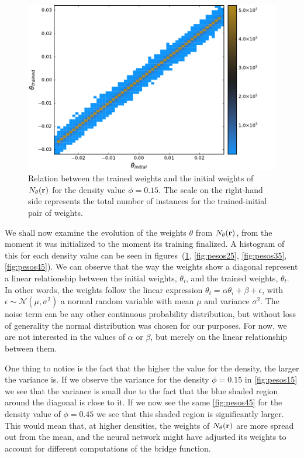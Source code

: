 \begin{figure}
    \includegraphics[width=\textwidth]{figuras/capitulo-3/weights_phi=0.15.pdf}
    \caption[Comparison between weights, $\phi=0.15$.]{Relation between the trained weights and the initial weights of $N_{\theta}(\mathbf{r})$ for the density value $\phi=0.15$. The scale on the right-hand side represents the total number of instances for the trained-initial pair of weights.} 
    \label{fig:pesos15}
\end{figure}

We shall now examine the evolution of the weights $\theta$ from
$N_{\theta}(\mathbf{r})$, from the moment it was initialized to the moment its training finalized.
A histogram of this for each density value can be seen in
figures~(\ref{fig:pesos15}, \ref{fig:pesos25}, \ref{fig:pesos35}, \ref{fig:pesos45}).
We can observe that the way the weights show a diagonal represent a linear relationship 
between the initial weights, $\theta_{i}$, and the trained weights, $\theta_{t}$. In other 
words, the weights follow the linear expression
$\theta_{t} = \alpha \theta_{i} + \beta + \epsilon$, with
$\epsilon \sim \mathcal{N}(\mu, \sigma^{2})$ a normal random variable with mean
$\mu$ and variance $\sigma^2$. The noise term can be any other continuous probability 
distribution, but without loss of generality the normal distribution was chosen for
our purposes. For now, we are not interested in the values of $\alpha$ or $\beta$,
but merely on the linear relationship between them.

One thing to notice is the fact that the higher the value for the density, the larger
the variance is. If we observe the variance for the density $\phi=0.15$ in \autoref{fig:pesos15}
we see that the variance is small due to the fact that the blue shaded region around
the diagonal is close to it. If we now see the same \autoref{fig:pesos45} for the 
density value of $\phi=0.45$ we see that this shaded region is significantly larger.
This would mean that, at higher densities, the weights of $N_{\theta}(\mathbf{r})$ are more spread out
from the mean, and the neural network might have adjusted its weights to account for
different computations of the bridge function.

